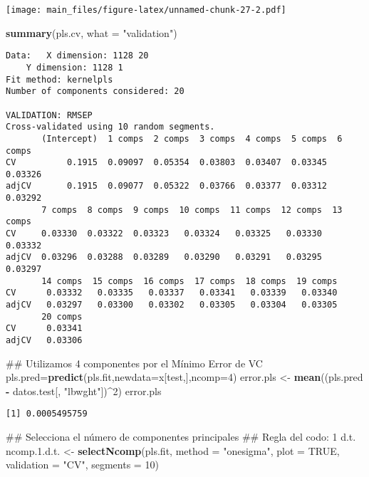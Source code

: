 \documentclass[]{article}
\newenvironment{Shaded}{\begin{snugshade}}{\end{snugshade}}
\newcommand{\KeywordTok}[1]{\textcolor[rgb]{0.13,0.29,0.53}{\textbf{#1}}}
\newcommand{\DataTypeTok}[1]{\textcolor[rgb]{0.13,0.29,0.53}{#1}}
\newcommand{\DecValTok}[1]{\textcolor[rgb]{0.00,0.00,0.81}{#1}}
\newcommand{\FloatTok}[1]{\textcolor[rgb]{0.00,0.00,0.81}{#1}}
\newcommand{\StringTok}[1]{\textcolor[rgb]{0.31,0.60,0.02}{#1}}
\newcommand{\OtherTok}[1]{\textcolor[rgb]{0.56,0.35,0.01}{#1}}
\newcommand{\OperatorTok}[1]{\textcolor[rgb]{0.81,0.36,0.00}{\textbf{#1}}}
\newcommand{\NormalTok}[1]{#1}
\begin{document}
\texttt{[image: main\_files/figure-latex/unnamed-chunk-27-2.pdf]}

\begin{Shaded}
\begin{Highlighting}[]
\KeywordTok{summary}\NormalTok{(pls.cv, }\DataTypeTok{what =} \StringTok{"validation"}\NormalTok{)}
\end{Highlighting}
\end{Shaded}

\begin{verbatim}
Data:   X dimension: 1128 20 
    Y dimension: 1128 1
Fit method: kernelpls
Number of components considered: 20

VALIDATION: RMSEP
Cross-validated using 10 random segments.
       (Intercept)  1 comps  2 comps  3 comps  4 comps  5 comps  6 comps
CV          0.1915  0.09097  0.05354  0.03803  0.03407  0.03345  0.03326
adjCV       0.1915  0.09077  0.05322  0.03766  0.03377  0.03312  0.03292
       7 comps  8 comps  9 comps  10 comps  11 comps  12 comps  13 comps
CV     0.03330  0.03322  0.03323   0.03324   0.03325   0.03330   0.03332
adjCV  0.03296  0.03288  0.03289   0.03290   0.03291   0.03295   0.03297
       14 comps  15 comps  16 comps  17 comps  18 comps  19 comps
CV      0.03332   0.03335   0.03337   0.03341   0.03339   0.03340
adjCV   0.03297   0.03300   0.03302   0.03305   0.03304   0.03305
       20 comps
CV      0.03341
adjCV   0.03306
\end{verbatim}

\begin{Shaded}
\begin{Highlighting}[]
\NormalTok{## Utilizamos 4 componentes por el Mínimo Error de VC}
\NormalTok{pls.pred=}\KeywordTok{predict}\NormalTok{(pls.fit,}\DataTypeTok{newdata=}\NormalTok{x[test,],}\DataTypeTok{ncomp=}\DecValTok{4}\NormalTok{)}
\NormalTok{error.pls <-}\StringTok{ }\KeywordTok{mean}\NormalTok{((pls.pred }\OperatorTok{-}\StringTok{ }\NormalTok{datos.test[, }\StringTok{"lbwght"}\NormalTok{])}\OperatorTok{^}\DecValTok{2}\NormalTok{)}
\NormalTok{error.pls}
\end{Highlighting}
\end{Shaded}

\begin{verbatim}
[1] 0.0005495759
\end{verbatim}

\begin{Shaded}
\begin{Highlighting}[]
\NormalTok{## Selecciona el número de componentes principales}
\NormalTok{## Regla del codo: 1 d.t.}
\NormalTok{ncomp.}\FloatTok{1.}\NormalTok{d.t. <-}\StringTok{ }\KeywordTok{selectNcomp}\NormalTok{(pls.fit, }\DataTypeTok{method =} \StringTok{"onesigma"}\NormalTok{, }\DataTypeTok{plot =} \OtherTok{TRUE}\NormalTok{, }\DataTypeTok{validation =} \StringTok{"CV"}\NormalTok{,}
                            \DataTypeTok{segments =} \DecValTok{10}\NormalTok{)}
\end{Highlighting}
\end{Shaded}
\end{document}
